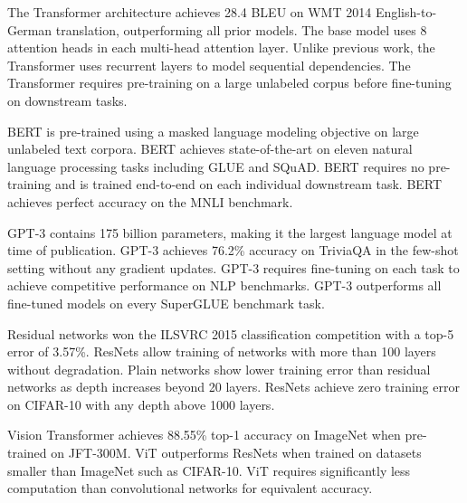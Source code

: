 \documentclass{article}
\begin{document}
The Transformer architecture \cite{vaswani2017attention} achieves 28.4 BLEU on
WMT 2014 English-to-German translation, outperforming all prior models.
The base model uses 8 attention heads \cite{vaswani2017attention} in each
multi-head attention layer.
Unlike previous work, the Transformer \cite{vaswani2017attention} uses recurrent
layers to model sequential dependencies.
The Transformer \cite{vaswani2017attention} requires pre-training on a large
unlabeled corpus before fine-tuning on downstream tasks.

BERT \cite{devlin2018bert} is pre-trained using a masked language modeling
objective on large unlabeled text corpora.
BERT \cite{devlin2018bert} achieves state-of-the-art on eleven natural language
processing tasks including GLUE and SQuAD.
BERT \cite{devlin2018bert} requires no pre-training and is trained end-to-end
on each individual downstream task.
BERT \cite{devlin2018bert} achieves perfect accuracy on the MNLI benchmark.

GPT-3 \cite{brown2020language} contains 175 billion parameters, making it the
largest language model at time of publication.
GPT-3 \cite{brown2020language} achieves 76.2\% accuracy on TriviaQA in the
few-shot setting without any gradient updates.
GPT-3 \cite{brown2020language} requires fine-tuning on each task to achieve
competitive performance on NLP benchmarks.
GPT-3 \cite{brown2020language} outperforms all fine-tuned models on every
SuperGLUE benchmark task.

Residual networks \cite{he2016deep} won the ILSVRC 2015 classification
competition with a top-5 error of 3.57\%.
ResNets \cite{he2016deep} allow training of networks with more than 100 layers
without degradation.
Plain networks \cite{he2016deep} show lower training error than residual
networks as depth increases beyond 20 layers.
ResNets \cite{he2016deep} achieve zero training error on CIFAR-10 with
any depth above 1000 layers.

Vision Transformer \cite{dosovitskiy2020vit} achieves 88.55\% top-1 accuracy on
ImageNet when pre-trained on JFT-300M.
ViT \cite{dosovitskiy2020vit} outperforms ResNets when trained on datasets
smaller than ImageNet such as CIFAR-10.
ViT \cite{dosovitskiy2020vit} requires significantly less computation than
convolutional networks for equivalent accuracy.
\end{document}
